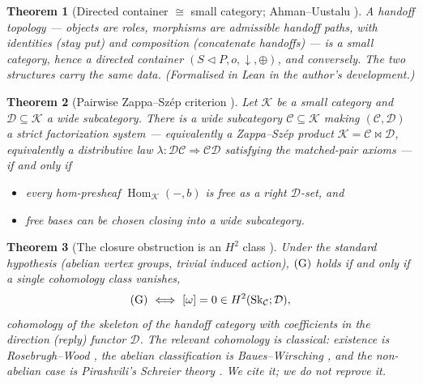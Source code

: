 \documentclass[11pt]{amsart}
\newtheorem{theorem}{Theorem}[section]
\theoremstyle{definition}
\theoremstyle{remark}
\newcommand{\Hom}{\operatorname{Hom}}
\newcommand{\C}{\mathcal{C}}
\newcommand{\D}{\mathcal{D}}
\newcommand{\K}{\mathcal{K}}
\newcommand{\Sk}{\mathrm{Sk}}
\newcommand{\seq}{\triangleleft}
\newcommand{\dir}{\mathcal{D}}
\begin{document}
\begin{theorem}[Directed container $\cong$ small category; Ahman--Uustalu \cite{AhmanUustalu}]
\label{thm:T1}
A handoff topology --- objects are roles, morphisms are admissible handoff paths, with
identities (stay put) and composition (concatenate handoffs) --- is a small category, hence a
directed container $(S\seq P,o,\downarrow,\oplus)$, and conversely. The two structures carry the
same data. \textup{(Formalised in Lean in the author's development.)}
\end{theorem}

\begin{theorem}[Pairwise Zappa--Sz\'ep criterion \cite{pairwise}]\label{thm:T2}
Let $\K$ be a small category and $\D\subseteq\K$ a wide subcategory. There is a wide
subcategory $\C\subseteq\K$ making $(\C,\D)$ a strict factorization system --- equivalently a
Zappa--Sz\'ep product $\K=\C\bowtie\D$, equivalently a distributive law
$\lambda:\D\C\Rightarrow\C\D$ satisfying the matched-pair axioms --- if and only if
\begin{itemize}
\item[\textnormal{(L)}] every hom-presheaf $\Hom_\K(-,b)$ is free as a right $\D$-set, and
\item[\textnormal{(G)}] free bases can be chosen closing into a wide subcategory.
\end{itemize}
\end{theorem}

\begin{theorem}[The closure obstruction is an $H^2$ class \cite{gobstr}]\label{thm:T3}
Under the standard hypothesis (abelian vertex groups, trivial induced action),
$\textnormal{(G)}$ holds if and only if a single cohomology class vanishes,
\[
  \textnormal{(G)}\ \Longleftrightarrow\ [\omega]=0\in H^2(\Sk_\C;\dir),
\]
cohomology of the skeleton of the handoff category with coefficients in the direction (reply)
functor $\dir$. The relevant cohomology is classical: existence is Rosebrugh--Wood \cite{rw},
the abelian classification is Baues--Wirsching \cite{baueswirsching}, and the non-abelian case
is Pirashvili's Schreier theory \cite{pirashvili}. We cite it; we do not reprove it.
\end{theorem}
\end{document}
